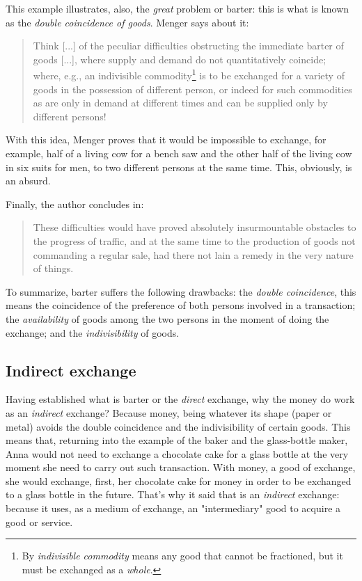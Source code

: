 \documentclass[12pt,a4paper,twoside]{book}
\begin{document}
This example illustrates, also, the \textit{great} problem or barter: this is what is known as the \textit{double coincidence of goods}. Menger says about it:

\begin{quotation}
Think [...] of the peculiar difficulties obstructing the immediate barter of goods [...], where supply and demand do not quantitatively coincide; where, e.g., an indivisible commodity\footnote{By \textit{indivisible commodity} means any good that cannot be fractioned, but it must be exchanged as a \textit{whole}.} is to be exchanged for a variety of goods in the possession of different person, or indeed for such commodities as are only in demand at different times and can be supplied only by different persons! \cite[p. 20]{menger:origins}
\end{quotation}

With this idea, Menger proves that it would be impossible to exchange, for example, half of a living cow for a bench saw and the other half of the living cow in six suits for men, to two different persons at the same time. This, obviously, is an absurd.

Finally, the author concludes in:

\begin{quotation}
These difficulties would have proved absolutely insurmountable obstacles to the progress of traffic, and at the same time to the production of goods not commanding a regular sale, had there not lain a remedy in the very nature of things. \cite[p. 20]{menger:origins}
\end{quotation}

To summarize, barter suffers the following drawbacks: the \textit{double coincidence}, this means the coincidence of the preference of both persons involved in a transaction; the \textit{availability} of goods among the two persons in the moment of doing the exchange; and the \textit{indivisibility} of goods.

\subsection{Indirect exchange}
Having established what is barter or the \textit{direct} exchange, why the money do work as an \textit{indirect} exchange? Because money, being whatever its shape (paper or metal) avoids the double coincidence and the indivisibility of certain goods. This means that, returning into the example of the baker and the glass-bottle maker, Anna would not need to exchange a chocolate cake for a glass bottle at the very moment she need to carry out such transaction. With money, a good of exchange, she would exchange, first, her chocolate cake for money in order to be exchanged to a glass bottle in the future. That's why it said that is an \textit{indirect} exchange: because it uses, as a medium of exchange, an "intermediary" good to acquire a good or service.
\end{document}
